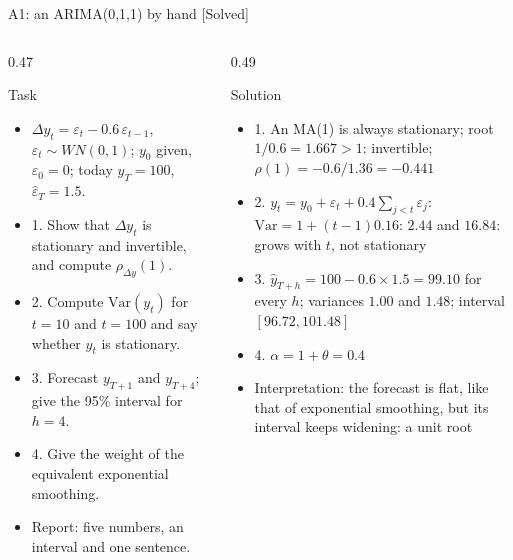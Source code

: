 \begin{frame}{A1: an ARIMA(0,1,1) by hand [Solved]}
\itemsize{\scriptsize}
\begin{columns}[T]
\begin{column}{0.47\textwidth}
\begin{block}{Task}
\begin{itemize}
    \item $\Delta y_t = \varepsilon_t - 0.6\,\varepsilon_{t-1}$, $\varepsilon_t \sim WN(0, 1)$; $y_0$ given, $\varepsilon_0 = 0$; today $y_T = 100$, $\hat\varepsilon_T = 1.5$.
    \item 1. Show that $\Delta y_t$ is stationary and invertible, and compute $\rho_{\Delta y}(1)$.
    \item 2. Compute $\mathrm{Var}(y_t)$ for $t = 10$ and $t = 100$ and say whether $y_t$ is stationary.
    \item 3. Forecast $y_{T+1}$ and $y_{T+4}$; give the 95\% interval for $h = 4$.
    \item 4. Give the weight of the equivalent exponential smoothing.
    \item Report: five numbers, an interval and one sentence.
\end{itemize}
\end{block}
\end{column}
\begin{column}{0.49\textwidth}
\begin{exampleblock}{Solution}
\begin{itemize}
    \item 1. An MA(1) is always stationary; root $1/0.6 = 1.667 > 1$: invertible; $\rho(1) = -0.6/1.36 = \ensuremath{-}0.441$
    \item 2. $y_t = y_0 + \varepsilon_t + 0.4\sum_{j<t}\varepsilon_j$: $\mathrm{Var} = 1 + (t - 1)0.16$: $2.44$ and $16.84$: grows with $t$, not stationary
    \item 3. $\hat y_{T+h} = 100 - 0.6 \times 1.5 = 99.10$ for every $h$; variances $1.00$ and $1.48$; interval $[96.72, 101.48]$
    \item 4. $\alpha = 1 + \theta = 0.4$
    \item Interpretation: the forecast is flat, like that of exponential smoothing, but its interval keeps widening: a unit root
\end{itemize}
\end{exampleblock}
\end{column}
\end{columns}
\end{frame}


